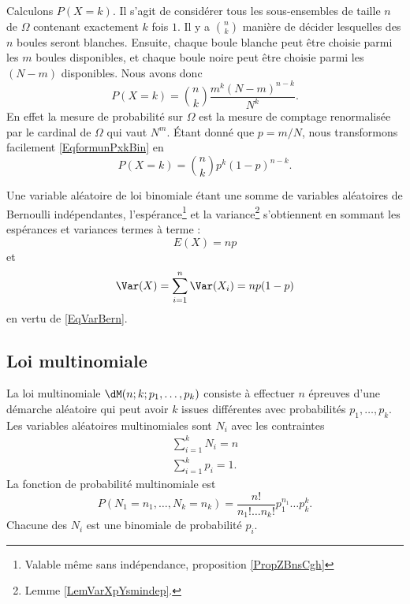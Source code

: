 Calculons \( P(X=k)\). Il s'agit de considérer tous les sous-ensembles de taille \( n\) de \( \Omega\) contenant exactement \( k\) fois \( 1\). Il y a \( {n\choose k}\) manière de décider lesquelles des \( n\) boules seront blanches. Ensuite, chaque boule blanche peut être choisie parmi les \( m\) boules disponibles, et chaque boule noire peut être choisie parmi les  \( (N-m)\) disponibles. Nous avons donc
\begin{equation}        \label{EqformunPxkBin}
    P(X=k)={n\choose k}\frac{ m^k(N-m)^{n-k} }{ N^k }.
\end{equation}
En effet la mesure de probabilité sur \( \Omega\) est la mesure de comptage renormalisée par le cardinal de \( \Omega\) qui vaut \( N^m\). Étant donné que \( p=m/N\), nous transformons facilement \eqref{EqformunPxkBin} en
\begin{equation}
    P(X=k)={n\choose k}p^k(1-p)^{n-k}.
\end{equation}

Une variable aléatoire de loi binomiale étant une somme de variables aléatoires de Bernoulli indépendantes, l'espérance\footnote{Valable même sans indépendance, proposition \ref{PropZBnsCgh}} et la variance\footnote{Lemme \ref{LemVarXpYsmindep}.} s'obtiennent en sommant les espérances et variances termes à terme  :
\begin{equation}    \label{EqDGbBgrv}
    E(X)=np
\end{equation}
et
\begin{equation}    \label{EqKLubWlh}
    \Var(X)=\sum_{i=1}^n\Var(X_i)=np(1-p)
\end{equation}
en vertu de \eqref{EqVarBern}.

\subsection{Loi multinomiale}

La loi multinomiale \( \dM(n;k;p_1,\ldots, p_k)\) consiste à effectuer \( n\) épreuves d'une démarche aléatoire qui peut avoir \( k\) issues différentes avec probabilités \( p_1,\ldots, p_k\). Les variables aléatoires multinomiales sont \( N_i\) avec les contraintes
\begin{subequations}
    \begin{align}
        \sum_{i=1}^kN_i=n\\
        \sum_{i=1}^kp_i=1.
    \end{align}
\end{subequations}
La fonction de probabilité multinomiale est
\begin{equation}
    P(N_1=n_1,\ldots, N_k=n_k)=\frac{ n! }{ n_1!\ldots n_k! }p_1^{n_1}\ldots p_k^k.
\end{equation}
Chacune des \( N_i\) est une binomiale de probabilité \( p_i\).

